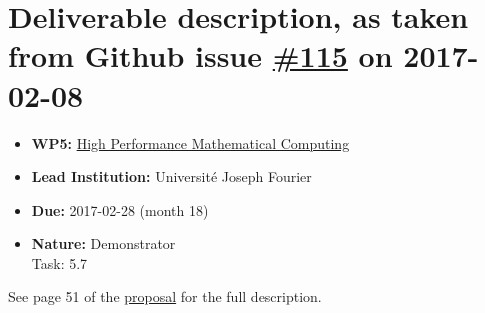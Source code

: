 \section*{\texorpdfstring{Deliverable description, as taken from Github
issue
\href{https://github.com/OpenDreamKit/OpenDreamKit/issues/115}{\#115} on
2017-02-08}{Deliverable description, as taken from Github issue \#115 on 2017-02-08}}\label{deliverable-description-as-taken-from-github-issue-115-on-2017-02-08}

\begin{itemize}
\tightlist
\item
  \textbf{WP5:}
  \href{https://github.com/OpenDreamKit/OpenDreamKit/tree/master/WP5}{High
  Performance Mathematical Computing}
\item
  \textbf{Lead Institution:} Université Joseph Fourier
\item
  \textbf{Due:} 2017-02-28 (month 18)
\item
  \textbf{Nature:} Demonstrator\\
  Task: 5.7
\end{itemize}

See page 51 of the
\href{https://github.com/OpenDreamKit/OpenDreamKit/raw/master/Proposal/proposal-www.pdf}{proposal}
for the full description.

